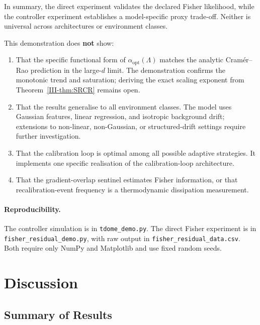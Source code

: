 \documentclass[12pt,a4paper,openany]{book}
\begin{document}
\noindent
In summary, the direct experiment validates the declared Fisher
likelihood, while the controller experiment establishes a model-specific
proxy trade-off.  Neither is universal across architectures or
environment classes.

\medskip
This demonstration does \textbf{not} show:
\begin{enumerate}
\item That the specific functional form of
  $\alpha_{\mathrm{opt}}(\Lambda)$ matches the analytic
  Cram\'{e}r--Rao prediction in the
  large-$d$ limit.  The demonstration confirms the
  monotonic trend and saturation; deriving the exact
  scaling exponent from Theorem~\ref{III-thm:SRCR}
  remains open.
\item That the results generalise to all environment
  classes.  The model uses Gaussian features, linear
  regression, and isotropic background drift; extensions
  to non-linear, non-Gaussian, or structured-drift
  settings require further investigation.
\item That the calibration loop is optimal among all
  possible adaptive strategies.  It implements one
  specific realisation of the calibration-loop
  architecture.
\item That the gradient-overlap sentinel estimates Fisher information,
  or that recalibration-event frequency is a thermodynamic dissipation
  measurement.
\end{enumerate}

\paragraph{Reproducibility.}
\begin{sloppypar}
The controller simulation is in \texttt{tdome\_demo.py}.  The direct
Fisher experiment is in \texttt{fisher\_residual\_demo.py}, with raw
output in \texttt{fisher\_residual\_data.csv}.  Both require only NumPy
and Matplotlib and use fixed random seeds.
\end{sloppypar}

\section{Discussion}
\label{III-sec:discussion}

\subsection{Summary of Results}
\label{III-subsec:summary}
\end{document}
